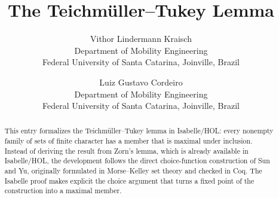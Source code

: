 \documentclass[11pt,a4paper]{article}
\begin{document}
\title{The Teichm\"uller--Tukey Lemma}
\author{%
  Vithor Lindermann Kraisch\\
  \small Department of Mobility Engineering\\
  \small Federal University of Santa Catarina, Joinville, Brazil
  \and
  Luiz Gustavo Cordeiro\\
  \small Department of Mobility Engineering\\
  \small Federal University of Santa Catarina, Joinville, Brazil}
\maketitle

\begin{abstract}
  This entry formalizes the Teichm\"uller--Tukey lemma in Isabelle/HOL:
  every nonempty family of sets of finite character has a member that is
  maximal under inclusion.  Instead of deriving the result from Zorn's lemma,
  which is already available in Isabelle/HOL, the development follows the
  direct choice-function construction of Sun and Yu, originally formulated in
  Morse--Kelley set theory and checked in Coq.  The Isabelle proof makes
  explicit the choice argument that turns a fixed point of the construction
  into a maximal member.
\end{abstract}

\tableofcontents





\end{document}
